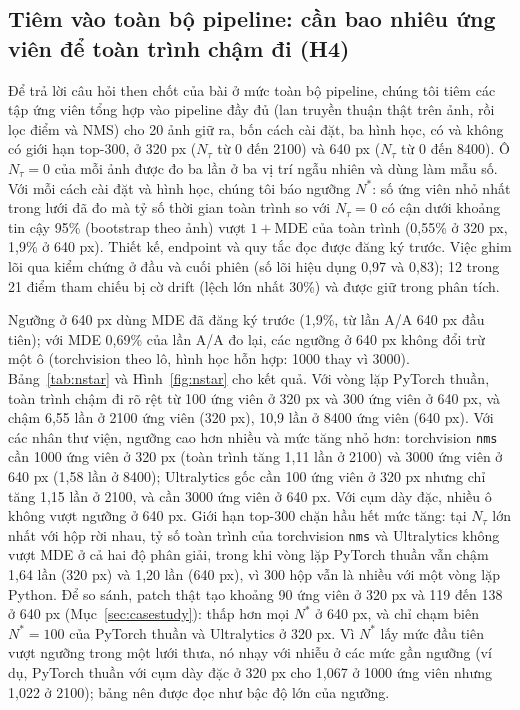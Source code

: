 \documentclass[a4paper,fleqn]{cas-dc}
\newcommand{\Ntau}{N_{\tau}}
\begin{document}
\subsection{Tiêm vào toàn bộ pipeline: cần bao nhiêu ứng viên để toàn trình chậm đi (H4)}
Để trả lời câu hỏi then chốt của bài ở mức toàn bộ pipeline, chúng tôi tiêm các tập ứng viên tổng hợp vào pipeline đầy đủ (lan truyền thuận thật trên ảnh, rồi lọc điểm và NMS) cho 20 ảnh giữ ra, bốn cách cài đặt, ba hình học, có và không có giới hạn top-300, ở 320 px ($\Ntau$ từ 0 đến 2100) và 640 px ($\Ntau$ từ 0 đến 8400). Ô $\Ntau=0$ của mỗi ảnh được đo ba lần ở ba vị trí ngẫu nhiên và dùng làm mẫu số. Với mỗi cách cài đặt và hình học, chúng tôi báo ngưỡng $N^{*}$: số ứng viên nhỏ nhất trong lưới đã đo mà tỷ số thời gian toàn trình so với $\Ntau=0$ có cận dưới khoảng tin cậy 95\% (bootstrap theo ảnh) vượt $1+\mathrm{MDE}$ của toàn trình (0,55\% ở 320 px, 1,9\% ở 640 px). Thiết kế, endpoint và quy tắc đọc được đăng ký trước. Việc ghim lõi qua kiểm chứng ở đầu và cuối phiên (số lõi hiệu dụng 0,97 và 0,83); 12 trong 21 điểm tham chiếu bị cờ drift (lệch lớn nhất 30\%) và được giữ trong phân tích.

Ngưỡng ở 640 px dùng MDE đã đăng ký trước (1,9\%, từ lần A/A 640 px đầu tiên); với MDE 0,69\% của lần A/A đo lại, các ngưỡng ở 640 px không đổi trừ một ô (torchvision theo lô, hình học hỗn hợp: 1000 thay vì 3000). Bảng~\ref{tab:nstar} và Hình~\ref{fig:nstar} cho kết quả. Với vòng lặp PyTorch thuần, toàn trình chậm đi rõ rệt từ 100 ứng viên ở 320 px và 300 ứng viên ở 640 px, và chậm 6,55 lần ở 2100 ứng viên (320 px), 10,9 lần ở 8400 ứng viên (640 px). Với các nhân thư viện, ngưỡng cao hơn nhiều và mức tăng nhỏ hơn: torchvision \texttt{nms} cần 1000 ứng viên ở 320 px (toàn trình tăng 1,11 lần ở 2100) và 3000 ứng viên ở 640 px (1,58 lần ở 8400); Ultralytics gốc cần 100 ứng viên ở 320 px nhưng chỉ tăng 1,15 lần ở 2100, và cần 3000 ứng viên ở 640 px. Với cụm dày đặc, nhiều ô không vượt ngưỡng ở 640 px. Giới hạn top-300 chặn hầu hết mức tăng: tại $\Ntau$ lớn nhất với hộp rời nhau, tỷ số toàn trình của torchvision \texttt{nms} và Ultralytics không vượt MDE ở cả hai độ phân giải, trong khi vòng lặp PyTorch thuần vẫn chậm 1,64 lần (320 px) và 1,20 lần (640 px), vì 300 hộp vẫn là nhiều với một vòng lặp Python. Để so sánh, patch thật tạo khoảng 90 ứng viên ở 320 px và 119 đến 138 ở 640 px (Mục~\ref{sec:casestudy}): thấp hơn mọi $N^{*}$ ở 640 px, và chỉ chạm biên $N^{*}=100$ của PyTorch thuần và Ultralytics ở 320 px. Vì $N^{*}$ lấy mức đầu tiên vượt ngưỡng trong một lưới thưa, nó nhạy với nhiễu ở các mức gần ngưỡng (ví dụ, PyTorch thuần với cụm dày đặc ở 320 px cho 1,067 ở 1000 ứng viên nhưng 1,022 ở 2100); bảng nên được đọc như bậc độ lớn của ngưỡng.
\end{document}
